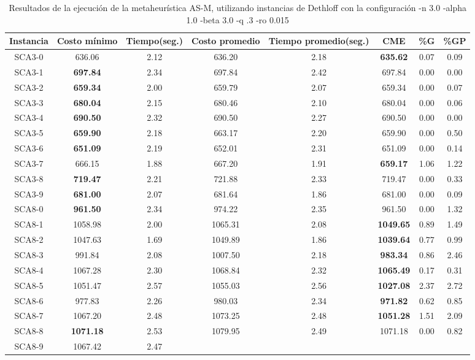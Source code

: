 \begin{table}[h]
\caption{Resultados de la ejecución de la metaheurística AS-M, utilizando instancias de Dethloff con la configuración -n 3.0 -alpha 1.0 -beta 3.0 -q .3 -ro 0.015}
\centering
\small
\begin{tabular}{c c c c c c c c}
\hline\hline
Instancia & Costo mínimo & Tiempo(seg.) & Costo promedio & Tiempo promedio(seg.) & CME & \%G & \%GP \\ [0.5ex]
\hline
SCA3-0 & 636.06 & 2.12 & 
636.20 & 2.18 & \bf{635.62} & 
0.07 & 0.09\\SCA3-1 & \bf{697.84} & 2.34 & 
697.84 & 2.42 & 697.84 & 0.00
 & 0.00\\
SCA3-2 & \bf{659.34} & 2.00 & 
659.79 & 2.07 & 659.34 & 0.00
 & 0.07\\SCA3-3 & \bf{680.04} & 2.15 & 
680.46 & 2.10 & 680.04 & 0.00
 & 0.06\\SCA3-4 & \bf{690.50} & 2.32 & 
690.50 & 2.27 & 690.50 & 0.00
 & 0.00\\
SCA3-5 & \bf{659.90} & 2.18 & 
663.17 & 2.20 & 659.90 & 0.00
 & 0.50\\SCA3-6 & \bf{651.09} & 2.19 & 
652.01 & 2.31 & 651.09 & 0.00
 & 0.14\\SCA3-7 & 666.15 & 1.88 & 
667.20 & 1.91 & \bf{659.17} & 
1.06 & 1.22\\SCA3-8 & \bf{719.47} & 2.21 & 
721.88 & 2.33 & 719.47 & 0.00
 & 0.33\\SCA3-9 & \bf{681.00} & 2.07 & 
681.64 & 1.86 & 681.00 & 0.00
 & 0.09\\SCA8-0 & \bf{961.50} & 2.34 & 
974.22 & 2.35 & 961.50 & 0.00
 & 1.32\\SCA8-1 & 1058.98 & 2.00 & 
1065.31 & 2.08 & \bf{1049.65} & 
0.89 & 1.49\\SCA8-2 & 1047.63 & 1.69 & 
1049.89 & 1.86 & \bf{1039.64} & 
0.77 & 0.99\\SCA8-3 & 991.84 & 2.08 & 
1007.50 & 2.18 & \bf{983.34} & 
0.86 & 2.46\\SCA8-4 & 1067.28 & 2.30 & 
1068.84 & 2.32 & \bf{1065.49} & 
0.17 & 0.31\\SCA8-5 & 1051.47 & 2.57 & 
1055.03 & 2.56 & \bf{1027.08} & 
2.37 & 2.72\\SCA8-6 & 977.83 & 2.26 & 
980.03 & 2.34 & \bf{971.82} & 
0.62 & 0.85\\SCA8-7 & 1067.20 & 2.48 & 
1073.25 & 2.48 & \bf{1051.28} & 
1.51 & 2.09\\SCA8-8 & \bf{1071.18} & 2.53 & 
1079.95 & 2.49 & 1071.18 & 0.00
 & 0.82\\SCA8-9 & 1067.42 & 2.47 & 

\end{tabular}
\end{table}
